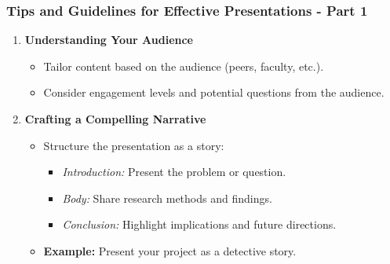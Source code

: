 \documentclass[aspectratio=169]{beamer}
\begin{document}
\begin{frame}[fragile]
    \frametitle{Tips and Guidelines for Effective Presentations - Part 1}
    \begin{enumerate}
        \item \textbf{Understanding Your Audience}
            \begin{itemize}
                \item Tailor content based on the audience (peers, faculty, etc.).
                \item Consider engagement levels and potential questions from the audience.
            \end{itemize}
            
        \item \textbf{Crafting a Compelling Narrative}
            \begin{itemize}
                \item Structure the presentation as a story:
                    \begin{itemize}
                        \item \textit{Introduction:} Present the problem or question.
                        \item \textit{Body:} Share research methods and findings.
                        \item \textit{Conclusion:} Highlight implications and future directions.
                    \end{itemize}
                \item \textbf{Example:} Present your project as a detective story.
            \end{itemize}
    \end{enumerate}
\end{frame}
\end{document}
